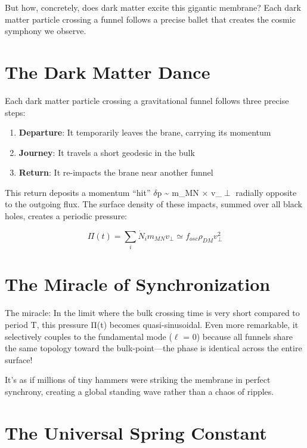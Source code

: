 \documentclass[
  11pt,
]{report}
\providecommand{\tightlist}{%
  \setlength{\itemsep}{0pt}\setlength{\parskip}{0pt}}
\begin{document}
But how, concretely, does dark matter excite this gigantic membrane?
Each dark matter particle crossing a funnel follows a precise ballet
that creates the cosmic symphony we observe.

\section{The Dark Matter Dance}\label{the-dark-matter-dance}

Each dark matter particle crossing a gravitational funnel follows three
precise steps:

\begin{enumerate}
\def\labelenumi{\arabic{enumi}.}
\tightlist
\item
  \textbf{Departure}: It temporarily leaves the brane, carrying its
  momentum
\item
  \textbf{Journey}: It travels a short geodesic in the bulk
\item
  \textbf{Return}: It re-impacts the brane near another funnel
\end{enumerate}

This return deposits a momentum ``hit'' \(\delta\)p \textasciitilde{}
m\_MN × v\_\(\perp\) radially opposite to the outgoing flux. The surface
density of these impacts, summed over all black holes, creates a
periodic pressure:

\[Π(t) = \sum_i \dot{N}_i m_{MN} v_\perp \simeq f_{osc} \rho_{DM} v_\perp^2\]

\section{The Miracle of
Synchronization}\label{the-miracle-of-synchronization}

The miracle: In the limit where the bulk crossing time is very short
compared to period T, this pressure Π(t) becomes quasi-sinusoidal. Even
more remarkable, it selectively couples to the fundamental mode
(\(\ell\) = 0) because all funnels share the same topology toward the
bulk-point---the phase is identical across the entire surface!

It's as if millions of tiny hammers were striking the membrane in
perfect synchrony, creating a global standing wave rather than a chaos
of ripples.

\section{The Universal Spring
Constant}\label{the-universal-spring-constant-1}
\end{document}
